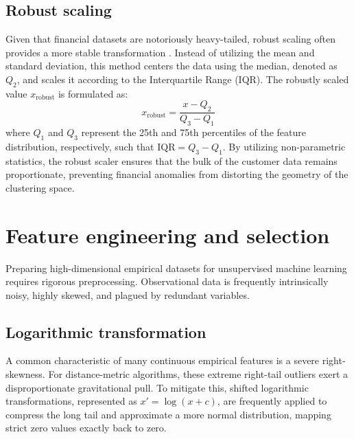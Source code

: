         \subsection{Robust scaling}
        \label{subsec:robust_scaling}
        Given that financial datasets are notoriously heavy-tailed, robust scaling often provides a more stable transformation \cite{pinheiro_impact_2025}. Instead of utilizing the mean and standard deviation, this method centers the data using the median, denoted as $Q_2$, and scales it according to the Interquartile Range (IQR). The robustly scaled value $x_{\text{robust}}$ is formulated as:
        \begin{equation}
            x_{\text{robust}} = \frac{x - Q_2}{Q_3 - Q_1}
            \label{eq:robust}
        \end{equation}
        where $Q_1$ and $Q_3$ represent the 25th and 75th percentiles of the feature distribution, respectively, such that $\text{IQR} = Q_3 - Q_1$. By utilizing non-parametric statistics, the robust scaler ensures that the bulk of the customer data remains proportionate, preventing financial anomalies from distorting the geometry of the clustering space.
        
    \section{Feature engineering and selection}
    \label{sec:feature_engineering_selection}
    Preparing high-dimensional empirical datasets for unsupervised machine learning requires rigorous preprocessing.
    Observational data is frequently intrinsically noisy, highly skewed, and plagued by redundant variables.
    
        \subsection{Logarithmic transformation}
        \label{subsec:log_transform}
        A common characteristic of many continuous empirical features is a severe right-skewness.
        For distance-metric algorithms, these extreme right-tail outliers exert a disproportionate gravitational pull.
        To mitigate this, shifted logarithmic transformations, represented as $x' = \log(x + c)$, are frequently applied to compress the long tail and approximate a more normal distribution, mapping strict zero values exactly back to zero.
        
